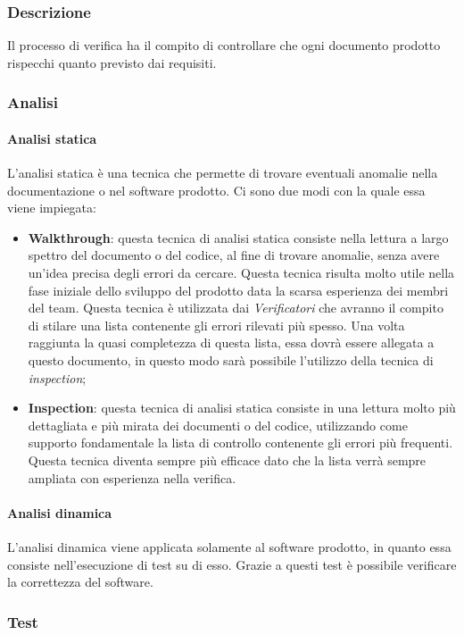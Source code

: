 \subsubsection{Descrizione}
Il processo di verifica ha il compito di controllare che ogni documento prodotto 
rispecchi quanto previsto dai requisiti.
\subsubsection{Analisi}
\paragraph{Analisi statica}
L'analisi statica è una tecnica che permette di trovare eventuali anomalie nella 
documentazione o nel software prodotto. Ci sono due modi con la quale essa viene 
impiegata:
\begin{itemize}
  \item \textbf{Walkthrough}: questa tecnica di analisi statica consiste nella 
  lettura a largo spettro del documento o del codice, al fine di trovare anomalie, 
  senza avere un'idea precisa degli errori da cercare. Questa tecnica risulta 
  molto utile nella fase iniziale dello sviluppo del prodotto data la scarsa 
  esperienza dei membri del team. Questa tecnica è utilizzata dai \textit{Verificatori} 
  che avranno il compito di stilare una lista contenente gli errori rilevati più 
  spesso. Una volta raggiunta la quasi completezza di questa lista, essa dovrà 
  essere allegata a questo documento, in questo modo sarà possibile l'utilizzo 
  della tecnica di \textit{inspection};
  \item \textbf{Inspection}: questa tecnica di analisi statica consiste in una 
  lettura molto più dettagliata e più mirata dei documenti o del codice, 
  utilizzando come supporto fondamentale la lista di controllo contenente gli 
  errori più frequenti. Questa tecnica diventa sempre più efficace dato che la 
  lista verrà sempre ampliata con esperienza nella verifica.
\end{itemize}
\paragraph{Analisi dinamica}
L'analisi dinamica viene applicata solamente al software prodotto, in quanto 
essa consiste nell'esecuzione di test su di esso. Grazie a questi test è 
possibile verificare la correttezza del software.
\subsubsection{Test}
